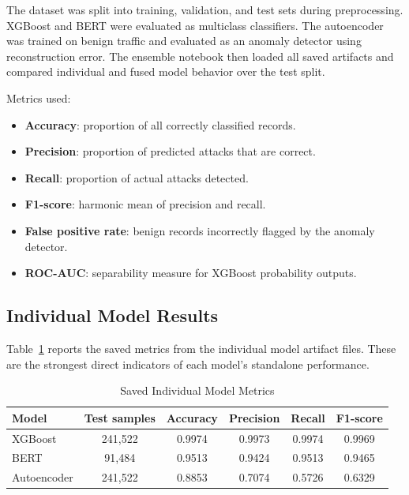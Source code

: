 \documentclass[12pt,a4paper]{article}
\begin{document}
The dataset was split into training, validation, and test sets during preprocessing. XGBoost and BERT were evaluated as multiclass classifiers. The autoencoder was trained on benign traffic and evaluated as an anomaly detector using reconstruction error. The ensemble notebook then loaded all saved artifacts and compared individual and fused model behavior over the test split.

Metrics used:

\begin{itemize}[leftmargin=1.2cm]
    \item \textbf{Accuracy}: proportion of all correctly classified records.
    \item \textbf{Precision}: proportion of predicted attacks that are correct.
    \item \textbf{Recall}: proportion of actual attacks detected.
    \item \textbf{F1-score}: harmonic mean of precision and recall.
    \item \textbf{False positive rate}: benign records incorrectly flagged by the anomaly detector.
    \item \textbf{ROC-AUC}: separability measure for XGBoost probability outputs.
\end{itemize}

\subsection{Individual Model Results}

Table~\ref{tab:individual_results} reports the saved metrics from the individual model artifact files. These are the strongest direct indicators of each model's standalone performance.

\begin{table}[H]
\centering
\caption{Saved Individual Model Metrics}
\label{tab:individual_results}
\small
\begin{tabular}{l c c c c c}
\toprule
Model & Test samples & Accuracy & Precision & Recall & F1-score \\
\midrule
XGBoost & 241,522 & 0.9974 & 0.9973 & 0.9974 & 0.9969 \\
BERT & 91,484 & 0.9513 & 0.9424 & 0.9513 & 0.9465 \\
Autoencoder & 241,522 & 0.8853 & 0.7074 & 0.5726 & 0.6329 \\
\bottomrule
\end{tabular}
\end{table}
\end{document}
